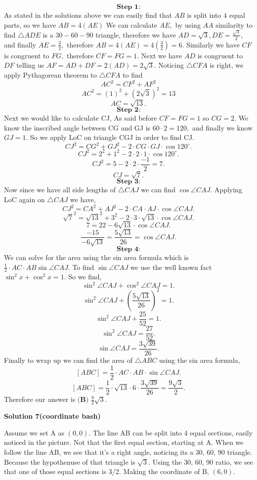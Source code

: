 \begin{enumerate}
 \[\textbf{Step 1:}\]As stated in the solutions above we can easily find that $AB$ is split into $4$ equal parts, so we have $AB=4(AE)$ We can calculate $AE,$ by using $AA$ similarity to find $\triangle{ADE}$ is a $30-60-90$ triangle, therefore we have $AD=\sqrt{3},DE=\frac{\sqrt{3}}{2},$ and finally $AE=\frac{3}{2},$ therefore $AB=4(AE)=4(\frac{3}{2})=6.$ Similarly we have $CF$ is congruent to $FG,$ therefore $CF=FG=1.$ Next we have $AD$ is congruent to $DF$ telling us $AF=AD+DF=2(AD)=2\sqrt{3}.$ Noticing $\triangle{CFA}$ is right, we apply Pythagorean theorem to $\triangle{CFA}$ to find 
 \[AC^2=CF^2+AF^2\]
 \[AC^2=(1)^2+(2\sqrt{3})^2=13\]
 \[AC=\sqrt{13}.\]
 \[\textbf{Step 2:}\]Next we would like to calculate CJ, As said before $CF=FG=1$ so $CG=2.$ We know the inscribed angle between CG and GJ is $60\cdot2=120,$ and finally we know $GJ=1.$ So we apply LoC on triangle CGJ in order to find CJ. 
 \[CJ^2=CG^2+GJ^2-2\cdot{CG}\cdot{GJ}\cdot\cos{120^{\circ}}.\] 
 \[CJ^2=2^2+1^2-2\cdot2\cdot1\cdot\cos{120^{\circ}}.\]
 \[CJ^2=5-2\cdot2\cdot\frac{-1}{2}=7.\] 
 \[CJ=\sqrt{7}.\]
 \[\textbf{Step 3:}\]Now since we have all side lengths of $\triangle{CAJ}$ we can find $\cos{\angle{CAJ}}.$ Applying LoC again on $\triangle{CAJ}$ we have, 
 \[CJ^2=CA^2+AJ^2-2\cdot{CA}\cdot{AJ}\cdot\cos{\angle{CAJ}}.\] 
 \[{\sqrt{7}}^2={\sqrt{13}}^2+{3}^2-2\cdot3\cdot{\sqrt{13}}\cdot\cos{\angle{CAJ}}.\]
 \[7=22-6{\sqrt{13}}\cdot\cos{\angle{CAJ}}.\]
 \[\frac{-15}{-6{\sqrt{13}}}=\frac{5\sqrt{13}}{26}=\cos{\angle{CAJ}}.\]
 \[\textbf{Step 4:}\]We can solve for the area using the sin area formula which is $\frac{1}{2}\cdot{AC}\cdot{AB}\sin{\angle{CAJ}}.$ To find $\sin{\angle{CAJ}}$ we use the well known fact $\sin^2{x}+\cos^2{x}=1.$ So we find, 
 \[\sin^2{\angle{CAJ}}+\cos^2{\angle{CAJ}}=1.\]
 \[\sin^2{\angle{CAJ}}+(\frac{5\sqrt{13}}{26})^2=1.\]
 \[\sin^2{\angle{CAJ}}+\frac{25}{52}=1.\]
 \[\sin^2{\angle{CAJ}}=\frac{27}{52}.\]
 \[\sin{\angle{CAJ}}=\frac{3\sqrt{39}}{26}.\]Finally to wrap up we can find the area of $\triangle{ABC}$ using the sin area formula, 
 \[[ABC]=\frac{1}{2}\cdot{AC}\cdot{AB}\cdot\sin{\angle{CAJ}}.\]
 \[[ABC]=\frac{1}{2}\cdot\sqrt{13}\cdot{6}\cdot\frac{3\sqrt{39}}{26}=\frac{9\sqrt{3}}{2}.\]Therefore our answer is $\boxed{\textbf{(B) } \frac{9}{2} \sqrt3.}$




\textbf{Solution 7(coordinate bash)}

Assume we set A as $(0, 0)$. The line AB can be split into 4 equal sections, easily noticed in the picture. Not that the first equal section, starting at A. When we follow the line AB, we see that it's a right angle, noticing its a 30, 60, 90 triangle. Because the hypothenuse of that triangle is $\sqrt{3}$. Using the 30, 60, 90 ratio, we see that one of those equal sections is 3/2. Making the coordinate of B, $(6, 0)$. 


\end{enumerate}
